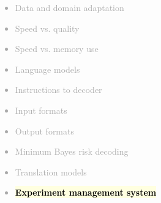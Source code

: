 \documentclass[landscape]{uedslides2C}
\newcommand{\currenttopic}[1]{\colorbox{lightyellow}{\textcolor{black}{\bf #1}}}
\begin{document}
% 
% 
	 

\vspace{-5mm}
\textcolor{darkgrey}{
\begin{itemize} \itemsep -1mm
\item Data and domain adaptation
\item Speed vs. quality
\item Speed vs. memory use
\item Language models
\item Instructions to decoder
\item Input formats
\item Output formats
\item Minimum Bayes risk decoding
\item Translation models
\item \currenttopic{Experiment management system}
\end{itemize}
}
\end{document}
